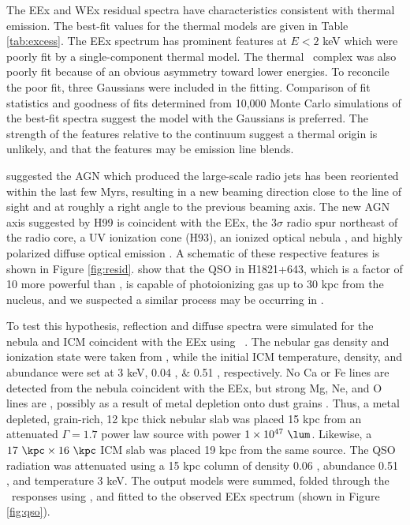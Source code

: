 \documentclass[useAMS,usenatbib]{mn2e}
\begin{document}
The EEx and WEx residual spectra have characteristics consistent with
thermal emission. The best-fit values for the thermal models are given
in Table \ref{tab:excess}. The EEx spectrum has prominent features at
$E < 2$ keV which were poorly fit by a single-component thermal
model. The thermal \feka\ complex was also poorly fit because of an
obvious asymmetry toward lower energies. To reconcile the poor fit,
three Gaussians were included in the fitting. Comparison of fit
statistics and goodness of fits determined from 10,000 Monte Carlo
simulations of the best-fit spectra suggest the model with the
Gaussians is preferred. The strength of the features relative to the
continuum suggest a thermal origin is unlikely, and that the features
may be emission line blends.

\citet[][hereafter H99]{1999ApJ...512..145H} suggested the AGN which
produced the large-scale radio jets has been reoriented within the
last few Myrs, resulting in a new beaming direction close to the line
of sight and at roughly a right angle to the previous beaming
axis. The new AGN axis suggested by H99 is coincident with the EEx,
the $3\sigma$ radio spur northeast of the radio core, a UV ionization
cone (H93), an ionized optical nebula \citep{1996MNRAS.283.1003C,
  1999Ap&SS.266..113A}, and highly polarized diffuse optical emission
\citep{2000AJ....120..562T}. A schematic of these respective features
is shown in Figure \ref{fig:resid}. \citet{2010MNRAS.402.1561R} show
that the QSO in H1821+643, which is a factor of 10 more powerful than
\irs, is capable of photoionizing gas up to 30 kpc from the nucleus,
and we suspected a similar process may be occurring in \irs.

To test this hypothesis, reflection and diffuse spectra were simulated
for the nebula and ICM coincident with the EEx using
\cloudy\ \citep{cloudy}. The nebular gas density and ionization state
were taken from \citet{2000AJ....120..562T}, while the initial ICM
temperature, density, and abundance were set at 3 keV, 0.04 \pcc, \&
0.51 \Zsol, respectively. No Ca or Fe lines are detected from the
nebula coincident with the EEx, but strong Mg, Ne, and O lines are
\citep{2000AJ....120..562T}, possibly as a result of metal depletion
onto dust grains \citep[\eg][]{1993ApJ...414L..17D}. Thus, a metal
depleted, grain-rich, 12 kpc thick nebular slab was placed 15 kpc from
an attenuated $\Gamma = 1.7$ power law source with power $1 \times
10^{47} ~\lum$. Likewise, a $17 ~\kpc \times 16 ~\kpc$ ICM slab was
placed 19 kpc from the same source. The QSO radiation was attenuated
using a 15 kpc column of density 0.06 \pcc, abundance 0.51 \Zsol, and
temperature 3 keV. The output models were summed, folded through the
\chandra\ responses using \xspec, and fitted to the observed EEx
spectrum (shown in Figure \ref{fig:qso}).
\end{document}
